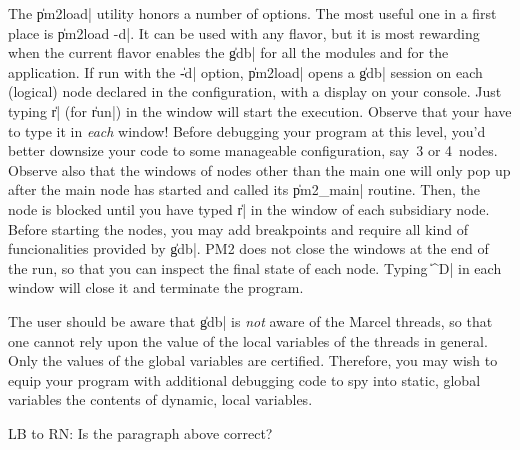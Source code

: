 The \|pm2load| utility honors a number of options.  The most useful
one in a first place is \|pm2load -d|. It can be used with any flavor,
but it is most rewarding when the current flavor enables the \|gdb|
for all the modules and for the application. If run with the \|-d|
option, \|pm2load| opens a \|gdb| session on each (logical) node
declared in the configuration, with a display on your console. Just
typing \|r| (for \|run|) in the window will start the execution.
Observe that your have to type it in \emph{each} window!  Before
debugging your program at this level, you'd better downsize your code
to some manageable configuration, say~3 or 4~nodes. Observe also that
the windows of nodes other than the main one will only pop up after
the main node has started and called its \|pm2_main| routine. Then,
the node is blocked until you have typed \|r| in the window of each
subsidiary node. Before starting the nodes, you may add breakpoints
and require all kind of funcionalities provided by \|gdb|.  PM2 does
not close the windows at the end of the run, so that you can inspect
the final state of each node. Typing \|^D| in each window will close
it and terminate the program.


The user should be aware that \|gdb| is \emph{not} aware of the Marcel
threads, so that one cannot rely upon the value of the local variables
of the threads in general. Only the values of the global variables are
certified. Therefore, you may wish to equip your program with
additional debugging code to spy into static, global variables the
contents of dynamic, local variables.

\begin{note}
  LB to RN: Is the paragraph above correct?
\end{note}

